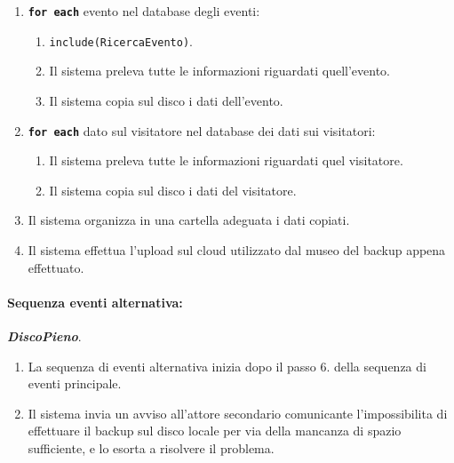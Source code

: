 \documentclass{article}
\begin{document}
\begin{enumerate}[itemsep=8pt,parsep=0pt]
  		\item \texttt{\textbf{for each}} evento nel database degli eventi:
	          \begin{enumerate}	[leftmargin=28pt]
			\item  \texttt{{include(RicercaEvento)}}.
	          	\item Il sistema preleva tutte le informazioni riguardati quell'evento.
			\item Il sistema copia sul disco i dati dell'evento.
	          \end{enumerate}

  		\item \texttt{\textbf{for each}} dato sul visitatore nel database dei dati sui visitatori:
	          \begin{enumerate}	[leftmargin=28pt]
	          	\item Il sistema preleva tutte le informazioni riguardati quel visitatore.
			\item Il sistema copia sul disco i dati del visitatore.
	          \end{enumerate}


		\item Il sistema organizza in una cartella adeguata i dati copiati.
		\item Il sistema effettua l'upload sul cloud utilizzato dal museo del backup appena effettuato.
	\end{enumerate}
	
    	\paragraph{Sequenza eventi alternativa:} \textbf{\textit{DiscoPieno}}.
	\begin{enumerate}[itemsep=8pt,parsep=0pt]
	\item La sequenza di eventi alternativa inizia dopo il passo 6. della sequenza di eventi principale.
	\item Il sistema invia un avviso all'attore secondario comunicante l'impossibilita di effettuare il backup sul disco locale per via della mancanza di spazio sufficiente, e lo esorta a risolvere il problema.
	\end{enumerate}
\end{document}
